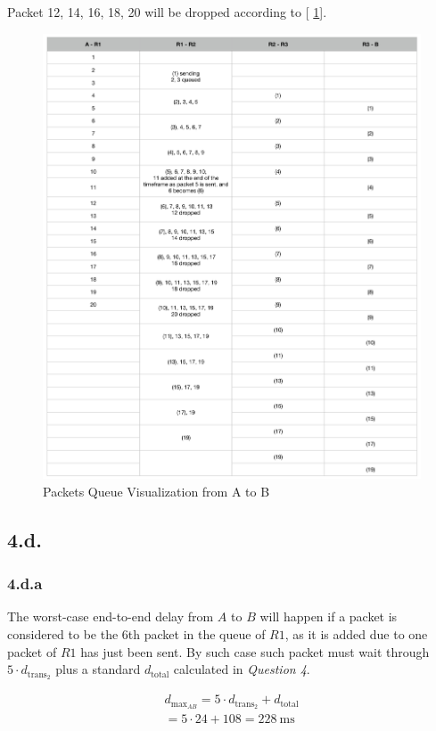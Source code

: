 \documentclass[12pt]{article}
\begin{document}
Packet 12, 14, 16, 18, 20 will be dropped according to [\figurename{ \ref{figure_1}}].

\begin{figure}
    \includegraphics[width = .745\textwidth]{figure_1.png}
    \caption{Packets Queue Visualization from A to B}
    \label{figure_1}
\end{figure}

\newpage

\subsection{4.d.}
\subsubsection{4.d.a}
The worst-case end-to-end delay from $A$ to $B$ will happen if a packet is considered to be the 6th packet in the queue of $R1$, as it is added due to one packet of $R1$ has just been sent. By such case such packet must wait through $5 \cdot d_{\text{trans}_{2}}$ plus a standard $d_{\text{total}}$ calculated in \textit{Question 4}.

\begin{gather}
    d_{\text{max}_{AB}} = 5 \cdot d_{\text{trans}_{2}} + d_{\text{total}} \\
    = 5 \cdot 24 + 108 = 228 \ \text{ms} \nonumber
\end{gather}
\end{document}
